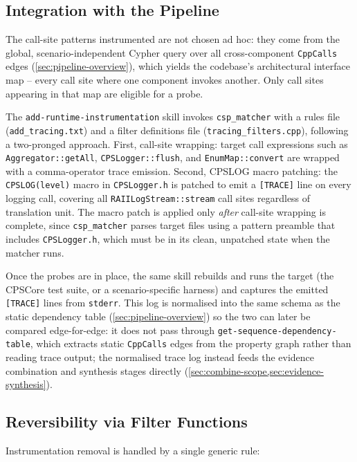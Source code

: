 \subsection{Integration with the Pipeline}

The call-site patterns instrumented are not chosen ad hoc: they come
from the global, scenario-independent Cypher query over all
cross-component \texttt{CppCalls} edges (\cref{sec:pipeline-overview}),
which yields the codebase's architectural interface map -- every call
site where one component invokes another. Only call sites appearing in
that map are eligible for a probe.

The \texttt{add-runtime-instrumentation} skill invokes
\texttt{csp\_matcher} with a rules file (\texttt{add\_tracing.txt}) and a
filter definitions file (\texttt{tracing\_filters.cpp}), following a
two-pronged approach. First, call-site wrapping: target call expressions
such as \texttt{Aggregator::getAll}, \texttt{CPSLogger::flush}, and
\texttt{EnumMap::convert} are wrapped with a comma-operator trace
emission. Second, CPSLOG macro patching: the \texttt{CPSLOG(level)}
macro in \texttt{CPSLogger.h} is patched to emit a \texttt{[TRACE]} line
on every logging call, covering all \texttt{RAIILogStream::stream} call
sites regardless of translation unit. The macro patch is applied only
\emph{after} call-site wrapping is complete, since \texttt{csp\_matcher}
parses target files using a pattern preamble that includes
\texttt{CPSLogger.h}, which must be in its clean, unpatched state when
the matcher runs.

Once the probes are in place, the same skill rebuilds and runs the
target (the CPSCore test suite, or a scenario-specific harness) and
captures the emitted \texttt{[TRACE]} lines from \texttt{stderr}. This
log is normalised into the same schema as the static dependency table
(\cref{sec:pipeline-overview}) so the two can later be compared
edge-for-edge: it does not pass through
\texttt{get-sequence-dependency-table}, which extracts static
\texttt{CppCalls} edges from the property graph rather than reading
trace output; the normalised trace log instead feeds the evidence
combination and synthesis stages directly
(\cref{sec:combine-scope,sec:evidence-synthesis}).

\subsection{Reversibility via Filter Functions}\label{sec:reversibility}

Instrumentation removal is handled by a single generic rule:

